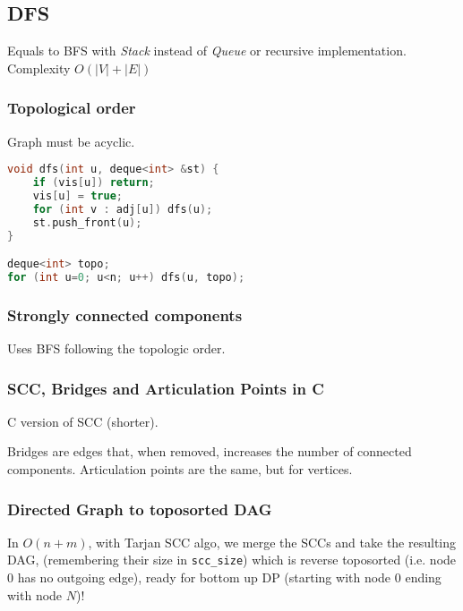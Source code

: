 \subsection{DFS}
Equals to BFS with \textit{Stack} instead of \textit{Queue} or recursive implementation. Complexity $O(|V|+|E|)$



\subsubsection{Topological order}
Graph must be acyclic.
\begin{lstlisting}[language=C++]
void dfs(int u, deque<int> &st) {
    if (vis[u]) return;
    vis[u] = true;
    for (int v : adj[u]) dfs(u);
    st.push_front(u);
}

deque<int> topo;
for (int u=0; u<n; u++) dfs(u, topo);
\end{lstlisting}

\subsubsection{Strongly connected components}
Uses BFS following the topologic order.


\subsubsection{SCC, Bridges and Articulation Points in C}
C version of SCC (shorter).


Bridges are edges that, when removed, increases the number of connected components. Articulation points are the same, but for vertices.


\subsubsection{Directed Graph to toposorted DAG}
In $O(n + m)$, with Tarjan SCC algo,
we merge the SCCs and take the resulting DAG,
(remembering their size in \lstinline|scc_size|)
which is reverse toposorted (i.e. node 0 has no outgoing edge),
ready for bottom up DP (starting with node 0 ending with node $N$)!

